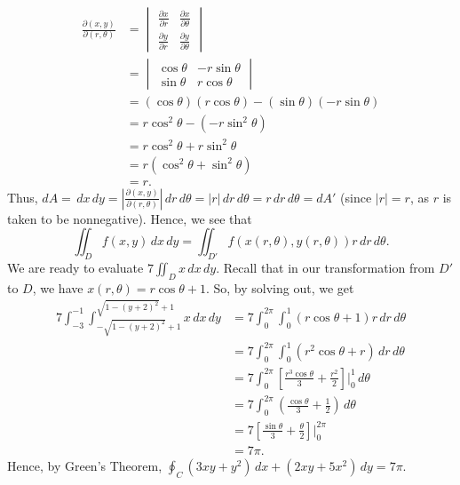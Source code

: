 \begin{align*}
    \frac{\partial (x,y)}{\partial (r,\theta)} & = 
        \begin{vmatrix}
            \frac{\partial x}{\partial r} & \frac{\partial x}{\partial \theta} \\
            \frac{\partial y}{\partial r} & \frac{\partial y}{\partial \theta}
        \end{vmatrix} \\
        & = 
        \begin{vmatrix}
            \cos\theta & -r\sin\theta \\
            \sin\theta & r\cos\theta
        \end{vmatrix} \\
        & = (\cos\theta)(r\cos\theta) - (\sin\theta)(-r\sin\theta) \\
        & = r\cos^2\theta - (-r\sin^2\theta) \\
        & = r\cos^2\theta + r\sin^2\theta \\
        & = r(\cos^2\theta + \sin^2\theta) \\
        & = r.
\end{align*}
Thus, $dA = \,dx\,dy = \left| \frac{\partial (x,y)}{\partial (r,\theta)} \right| \,dr\,d\theta = |r|\,dr\,d\theta = r\,dr\,d\theta = dA'$ (since $|r| = r$, as $r$ is taken to be nonnegative). Hence, we see that
\begin{equation*}
    \iint_D f(x,y) \,dx\,dy = \iint_{D'} f(x(r,\theta),y(r,\theta))r\,dr\,d\theta.
\end{equation*}
We are ready to evaluate $7\iint_D x \,dx\,dy$. Recall that in our transformation from $D'$ to $D$, we have $x(r,\theta) = r\cos\theta + 1$. So, by solving out, we get
\begin{align*}
    7\int_{-3}^{-1} \int_{-\sqrt{1-(y+2)^2}+1}^{\sqrt{1-(y+2)^2}+1} x \,dx\,dy & = 7\int_0^{2\pi} \int_0^1 (r\cos\theta + 1)r\,dr\,d\theta \\
    & = 7\int_0^{2\pi} \int_0^1 (r^2\cos\theta + r) \,dr\,d\theta \\
    & = 7\int_0^{2\pi} \left[ \frac{r^3\cos\theta}{3} + \frac{r^2}{2} \right] \bigg|_0^1 \,d\theta \\
    & = 7\int_0^{2\pi} \left( \frac{\cos\theta}{3} + \frac{1}{2} \right) \,d\theta \\
    & = 7 \left[ \frac{\sin\theta}{3} + \frac{\theta}{2} \right] \bigg|_0^{2\pi} \\
    & = 7\pi.
\end{align*}
Hence, by Green's Theorem, $\oint_C (3xy + y^2)\,dx + (2xy + 5x^2)\,dy = 7\pi$.
